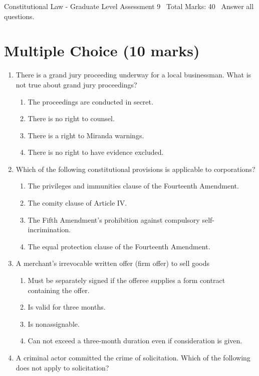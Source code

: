 \documentclass[12pt]{article}
\begin{document}
\begin{center}
Constitutional Law - Graduate Level Assessment 9 \
Total Marks: 40 \
Answer all questions.
\end{center}

\section*{Multiple Choice (10 marks)}
\begin{enumerate}[label=\arabic*.]
\item There is a grand jury proceeding underway for a local businessman. What is not true about grand jury proceedings?
\begin{enumerate}[label=(\alph*)]
    \item The proceedings are conducted in secret.
    \item There is no right to counsel.
    \item There is a right to Miranda warnings.
    \item There is no right to have evidence excluded.
\end{enumerate}
\item Which of the following constitutional provisions is applicable to corporations?
\begin{enumerate}[label=(\alph*)]
    \item The privileges and immunities clause of the Fourteenth Amendment.
    \item The comity clause of Article IV.
    \item The Fifth Amendment's prohibition against compulsory self-incrimination.
    \item The equal protection clause of the Fourteenth Amendment.
\end{enumerate}
\item A merchant's irrevocable written offer (firm offer) to sell goods
\begin{enumerate}[label=(\alph*)]
    \item Must be separately signed if the offeree supplies a form contract containing the offer.
    \item Is valid for three months.
    \item Is nonassignable.
    \item Can not exceed a three-month duration even if consideration is given.
\end{enumerate}
\item A criminal actor committed the crime of solicitation. Which of the following does not apply to solicitation?

\end{enumerate}
\end{document}
